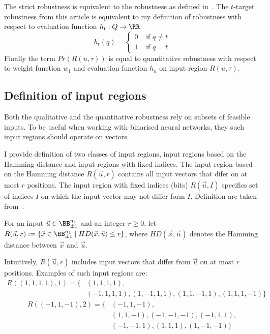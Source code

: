 The strict robustness is equivalent to the robustness as defined in~\cite{10.1145/3563212}.
The $t$-target robustness from this article is equivalent to my definition
of robustness with respect to evaluation function $h_t: Q\to \RR$%
\label{sec:t-target_robustness}
\begin{equation*}
    h_t(q) = \left\{\begin{matrix}
        0 & \text{ if } q \neq t\\
        1 & \text{ if } q = t
    \end{matrix}\right.
\end{equation*}
Finally the term $Pr(R(u, \tau))$ is equal to quantitative robustness  %
with respect to weight function $w_1$ and evaluation function $h_u$
on input region $R(u, \tau)$.


\subsection{Definition of input regions}

Both the qualitative and the quantitative robustness rely on subsets
of feasible inputs. To be useful when working with binarised neural networks,
they such input regions should operate on vectors.

I provide definition of two classes of input regions, input regions based
on the Hamming distance and input regions with fixed indices.
The input region based on the Hamming distance $R(\vec u, r)$ contains
all input vectors that difer on at most $r$ positions.
The input region with fixed indices (bits) $R(\vec u, I)$ specifies set of indices $I$
on which the input vector may not differ form $I$.
Definition are taken from~\cite{zhang2021bdd4bnn}.

\begin{definition}
    For an input $\vec u\in \BB^{n_1}_{\pm 1}$ and an integer $r \geq 0$, let
    $R(\vec u, r) := \{\vec x\in \BB^{n_1}_{\pm 1} \mid HD(\vec x, \vec u) \leq r \}$,
    where $HD(\vec x, \vec u)$ denotes the Hamming distance
    between $\vec x$ and $\vec u$.
\end{definition}

Intuitively, $R(\vec u, r)$ includes input vectors that differ from $\vec u$ on at most
$r$ positions. Examples of such input regions are:
\begin{align*}
    R((1, 1, 1, 1), 1) = \{&(1, 1, 1, 1),\\
    &(-1, 1, 1, 1), (1, -1, 1, 1), (1, 1, -1, 1), (1, 1, 1, -1)\}
\end{align*}
\begin{align*}
    R((-1, 1, -1), 2) = \{&(-1, 1, -1),\\
    &(1, 1, -1), (-1, -1, -1), (-1, 1, 1),\\
    &(-1, -1, 1), (1, 1, 1), (1, -1, -1)\}
\end{align*}

